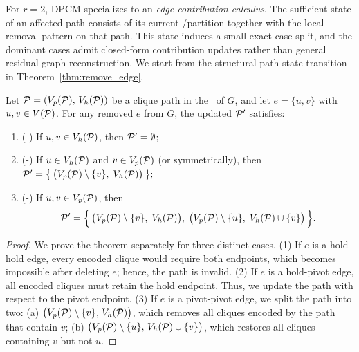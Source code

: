 \label{sec:r2}

For $r{=}2$, DPCM specializes to an \emph{edge-contribution calculus}.
%
The sufficient state of an affected path consists of its current \hold/\pivot partition together with the local removal pattern on that path.
%
This state induces a small exact case split, and the dominant cases admit closed-form contribution updates rather than general residual-graph reconstruction.
%
We start from the structural path-state transition in Theorem~\ref{thm:remove_edge}.
%

\begin{theorem}\label{thm:remove_edge}
Let $\TPath=(V_p(\TPath),\,V_h(\TPath))$ be a clique path in the \cpi\ of $G$, and let $e=\{u,v\}$ with $u,v\in V(\TPath)$. For any removed $e$ from $G$,  the updated $\TPath'$ satisfies:

\begin{enumerate}[leftmargin=*]
  \item (\hold-\hold) If $u,v\in V_h(\TPath)$, then $\TPath'=\emptyset$;
  \item (\hold-\pivot) If $u\in V_h(\TPath)$ and $v\in V_p(\TPath)$ (or symmetrically), then
        $
          \TPath'=\bigl\{\,\bigl(V_p(\TPath)\setminus\{v\},\; V_h(\TPath)\bigr)\,\bigr\};
        $
  \item (\pivot-\pivot) If $u,v\in V_p(\TPath)$, then
        \[
          \TPath'=\Bigl\{\,
              \bigl(V_p(\TPath)\setminus\{v\},\; V_h(\TPath)\bigr),\;
              \bigl(V_p(\TPath)\setminus\{u\},\; V_h(\TPath)\cup\{v\}\bigr)
            \,\Bigr\}.
        \]
\end{enumerate}

\end{theorem}


\begin{proof}
We prove the theorem separately for three distinct cases.  
%
(1) If $e$ is a hold-hold edge, every encoded clique would require both endpoints, which becomes impossible after deleting $e$; hence, the path is invalid.  
%
(2) If $e$ is a hold-pivot edge, all encoded cliques must retain the hold endpoint. 
Thus, we update the path with respect to the pivot endpoint.
%
(3) If $e$ is a pivot-pivot edge, we split the path into two:  
(a) $\bigl(V_p(\TPath)\setminus\{v\},\, V_h(\TPath)\bigr)$, which removes all cliques encoded by the path that contain $v$;  
(b) $\bigl(V_p(\TPath)\setminus\{u\},\, V_h(\TPath)\cup\{v\}\bigr)$, which restores all cliques containing $v$ but not $u$.
\end{proof}

